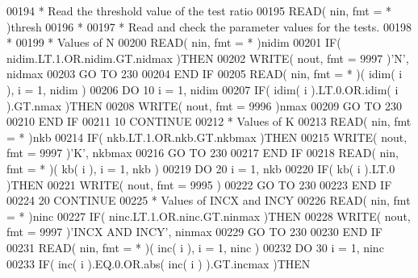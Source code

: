\begin{DoxyCode}
00194 \textcolor{comment}{*     Read the threshold value of the test ratio}
00195       \textcolor{keyword}{READ}( nin, fmt = * )thresh
00196 \textcolor{comment}{*}
00197 \textcolor{comment}{*     Read and check the parameter values for the tests.}
00198 \textcolor{comment}{*}
00199 \textcolor{comment}{*     Values of N}
00200       \textcolor{keyword}{READ}( nin, fmt = * )nidim
00201       \textcolor{keywordflow}{IF}( nidim.LT.1.OR.nidim.GT.nidmax )\textcolor{keywordflow}{THEN}
00202          \textcolor{keyword}{WRITE}( nout, fmt = 9997 )\textcolor{stringliteral}{'N'}, nidmax
00203          \textcolor{keywordflow}{GO TO} 230
00204 \textcolor{keywordflow}{      END IF}
00205       \textcolor{keyword}{READ}( nin, fmt = * )( idim( i ), i = 1, nidim )
00206       \textcolor{keywordflow}{DO} 10 i = 1, nidim
00207          \textcolor{keywordflow}{IF}( idim( i ).LT.0.OR.idim( i ).GT.nmax )\textcolor{keywordflow}{THEN}
00208             \textcolor{keyword}{WRITE}( nout, fmt = 9996 )nmax
00209             \textcolor{keywordflow}{GO TO} 230
00210 \textcolor{keywordflow}{         END IF}
00211    10 \textcolor{keywordflow}{CONTINUE}
00212 \textcolor{comment}{*     Values of K}
00213       \textcolor{keyword}{READ}( nin, fmt = * )nkb
00214       \textcolor{keywordflow}{IF}( nkb.LT.1.OR.nkb.GT.nkbmax )\textcolor{keywordflow}{THEN}
00215          \textcolor{keyword}{WRITE}( nout, fmt = 9997 )\textcolor{stringliteral}{'K'}, nkbmax
00216          \textcolor{keywordflow}{GO TO} 230
00217 \textcolor{keywordflow}{      END IF}
00218       \textcolor{keyword}{READ}( nin, fmt = * )( kb( i ), i = 1, nkb )
00219       \textcolor{keywordflow}{DO} 20 i = 1, nkb
00220          \textcolor{keywordflow}{IF}( kb( i ).LT.0 )\textcolor{keywordflow}{THEN}
00221             \textcolor{keyword}{WRITE}( nout, fmt = 9995 )
00222             \textcolor{keywordflow}{GO TO} 230
00223 \textcolor{keywordflow}{         END IF}
00224    20 \textcolor{keywordflow}{CONTINUE}
00225 \textcolor{comment}{*     Values of INCX and INCY}
00226       \textcolor{keyword}{READ}( nin, fmt = * )ninc
00227       \textcolor{keywordflow}{IF}( ninc.LT.1.OR.ninc.GT.ninmax )\textcolor{keywordflow}{THEN}
00228          \textcolor{keyword}{WRITE}( nout, fmt = 9997 )\textcolor{stringliteral}{'INCX AND INCY'}, ninmax
00229          \textcolor{keywordflow}{GO TO} 230
00230 \textcolor{keywordflow}{      END IF}
00231       \textcolor{keyword}{READ}( nin, fmt = * )( inc( i ), i = 1, ninc )
00232       \textcolor{keywordflow}{DO} 30 i = 1, ninc
00233          \textcolor{keywordflow}{IF}( inc( i ).EQ.0.OR.abs( inc( i ) ).GT.incmax )\textcolor{keywordflow}{THEN}

\end{DoxyCode}
